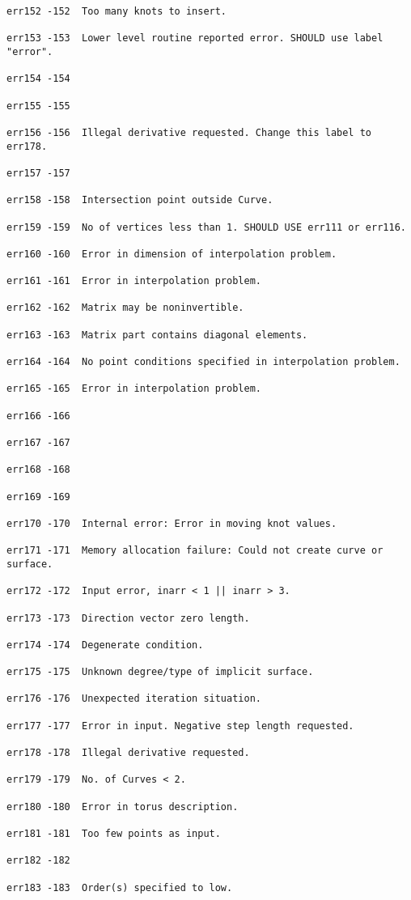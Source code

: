 \begin{verbatim}
err152 -152  Too many knots to insert.

err153 -153  Lower level routine reported error. SHOULD use label "error".

err154 -154

err155 -155

err156 -156  Illegal derivative requested. Change this label to err178.

err157 -157

err158 -158  Intersection point outside Curve.

err159 -159  No of vertices less than 1. SHOULD USE err111 or err116.

err160 -160  Error in dimension of interpolation problem.

err161 -161  Error in interpolation problem.

err162 -162  Matrix may be noninvertible.

err163 -163  Matrix part contains diagonal elements.

err164 -164  No point conditions specified in interpolation problem.

err165 -165  Error in interpolation problem.

err166 -166

err167 -167

err168 -168

err169 -169

err170 -170  Internal error: Error in moving knot values.

err171 -171  Memory allocation failure: Could not create curve or surface.

err172 -172  Input error, inarr < 1 || inarr > 3.

err173 -173  Direction vector zero length.

err174 -174  Degenerate condition.

err175 -175  Unknown degree/type of implicit surface.

err176 -176  Unexpected iteration situation.

err177 -177  Error in input. Negative step length requested.

err178 -178  Illegal derivative requested.

err179 -179  No. of Curves < 2.

err180 -180  Error in torus description.

err181 -181  Too few points as input.

err182 -182

err183 -183  Order(s) specified to low.


\end{verbatim}
